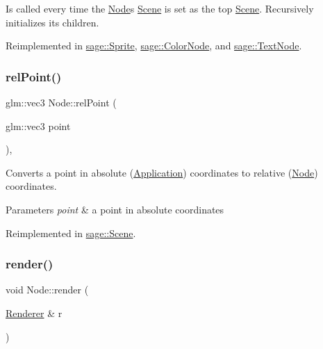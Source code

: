 Is called every time the \mbox{\hyperlink{classsage_1_1Node}{Node}}\textquotesingle{}s \mbox{\hyperlink{classsage_1_1Scene}{Scene}} is set as the top \mbox{\hyperlink{classsage_1_1Scene}{Scene}}. Recursively initializes its children. 



Reimplemented in \mbox{\hyperlink{classsage_1_1Sprite_aeaf5c7aa5aeff1b0a4da9e66430f1c42}{sage\+::\+Sprite}}, \mbox{\hyperlink{classsage_1_1ColorNode_a1a5a055be2cc8d15b38c5c25eb489e94}{sage\+::\+Color\+Node}}, and \mbox{\hyperlink{classsage_1_1TextNode_ae389b7b4afae4d068ac29686343f279e}{sage\+::\+Text\+Node}}.

\mbox{\label{classsage_1_1Node_a40edd1724c0956ef7794225fba8353c0}} 
\subsubsection{\texorpdfstring{relPoint()}{relPoint()}}
{\footnotesize\ttfamily glm\+::vec3 Node\+::rel\+Point (\begin{DoxyParamCaption}\item[{glm\+::vec3}]{point }\end{DoxyParamCaption})\hspace{0.3cm}{\ttfamily [protected]}, {\ttfamily [virtual]}}



Converts a point in absolute (\mbox{\hyperlink{classsage_1_1Application}{Application}}) coordinates to relative (\mbox{\hyperlink{classsage_1_1Node}{Node}}) coordinates. 


\begin{DoxyParams}{Parameters}
{\em point} & a point in absolute coordinates \\
\hline
\end{DoxyParams}


Reimplemented in \mbox{\hyperlink{classsage_1_1Scene_ae68e14c0f453db078df4b515fdea83f7}{sage\+::\+Scene}}.

\mbox{\label{classsage_1_1Node_a1a5d13b9c959039084843403382f73eb}} 
\subsubsection{\texorpdfstring{render()}{render()}}
{\footnotesize\ttfamily void Node\+::render (\begin{DoxyParamCaption}\item[{\mbox{\hyperlink{classsage_1_1Renderer}{Renderer}} \&}]{r }\end{DoxyParamCaption})\hspace{0.3cm}{\ttfamily [virtual]}}



